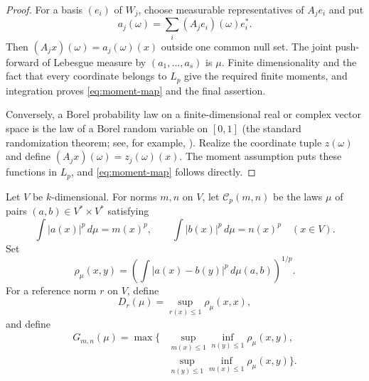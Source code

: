 \documentclass[11pt]{article}
\begin{document}
\begin{proof}
For a basis $(e_i)$ of $W_j$, choose measurable representatives of
$A_je_i$ and put
\[
       a_j(\omega)=\sum_i (A_je_i)(\omega)e_i^*.
\]
Then $(A_jx)(\omega)=a_j(\omega)(x)$ outside one common null set.  The
joint push-forward of Lebesgue measure by $(a_1,\ldots,a_s)$ is $\mu$.
Finite dimensionality and the fact that every coordinate belongs to $L_p$
give the required finite moments, and integration proves
\eqref{eq:moment-map} and the final assertion.

Conversely, a Borel probability law on a finite-dimensional real or complex
vector space is the law of a Borel random variable on $[0,1]$ (the standard
randomization theorem; see, for example, \cite{Kallenberg}).  Realize the
coordinate tuple $z(\omega)$ and define
$(A_jx)(\omega)=z_j(\omega)(x)$.  The moment assumption puts these functions
in $L_p$, and \eqref{eq:moment-map} follows directly.
\end{proof}

Let $V$ be $k$-dimensional.  For norms $m,n$ on $V$, let
$\mathcal C_p(m,n)$ be the laws $\mu$ of pairs $(a,b)\in V^*\times V^*$
satisfying
\begin{equation}\label{eq:pair-constraints}
 \int |a(x)|^p\,d\mu=m(x)^p,
 \qquad
 \int |b(x)|^p\,d\mu=n(x)^p
 \quad(x\in V).
\end{equation}
Set
\[
 \rho_\mu(x,y)=
 \left(\int |a(x)-b(y)|^p\,d\mu(a,b)\right)^{1/p}.
\]
For a reference norm $r$ on $V$, define
\[
 D_r(\mu)=\sup_{r(x)\leq1}\rho_\mu(x,x),
\]
and define
\begin{align}
 G_{m,n}(\mu)=\max\bigg\{&
 \sup_{m(x)\leq1}\inf_{n(y)\leq1}\rho_\mu(x,y),\nonumber\\
 &\sup_{n(y)\leq1}\inf_{m(x)\leq1}\rho_\mu(x,y)
 \bigg\}.\label{eq:G}
\end{align}
\end{document}
